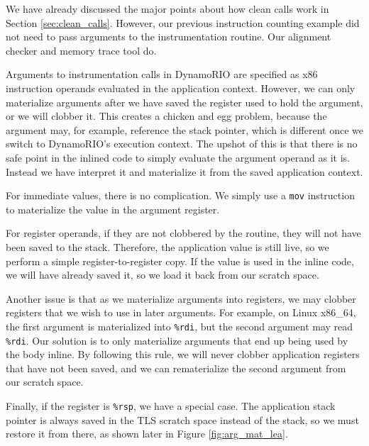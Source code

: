 We have already discussed the major points about how clean calls work in Section
\ref{sec:clean_calls}.  However, our previous instruction counting example did
not need to pass arguments to the instrumentation routine.  Our alignment
checker and memory trace tool do.

Arguments to instrumentation calls in DynamoRIO are specified as x86 instruction
operands evaluated in the application context.  However, we can only materialize
arguments after we have saved the register used to hold the argument, or we will
clobber it.  This creates a chicken and egg problem, because the argument may,
for example, reference the stack pointer, which is different once we switch to
DynamoRIO's execution context.  The upshot of this is that there is no safe
point in the inlined code to simply evaluate the argument operand as it is.
Instead we have interpret it and materialize it from the saved application
context.

For immediate values, there is no complication.  We simply use a {\tt mov}
instruction to materialize the value in the argument register.

For register operands, if they are not clobbered by the routine, they will not
have been saved to the stack.  Therefore, the application value is still live,
so we perform a simple register-to-register copy.  If the value is used in the
inline code, we will have already saved it, so we load it back from our scratch
space.

Another issue is that as we materialize arguments into registers, we may clobber
registers that we wish to use in later arguments.  For example, on Linux
x86\_64, the first argument is materialized into {\tt \%rdi}, but the second
argument may read {\tt \%rdi}.  Our solution is to only materialize arguments
that end up being used by the body inline.  By following this rule, we will
never clobber application registers that have not been saved, and we can
rematerialize the second argument from our scratch space.

Finally, if the register is {\tt \%rsp}, we have a special case.  The
application stack pointer is always saved in the TLS scratch space instead of
the stack, so we must restore it from there, as shown later in Figure
\ref{fig:arg_mat_lea}.

